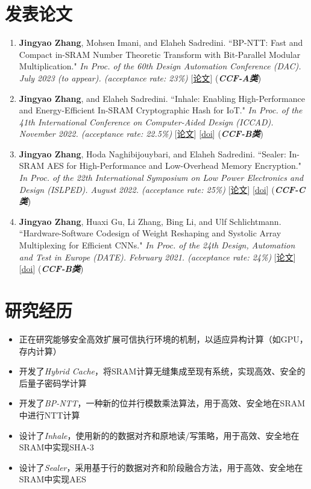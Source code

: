 \documentclass{resume}
\begin{document}
\section{发表论文}
\begin{enumerate}
  \item \textbf{Jingyao Zhang}, Mohsen Imani, and Elaheh Sadredini. ``BP-NTT: Fast and Compact in-SRAM Number Theoretic Transform with Bit-Parallel Modular Multiplication." \textit{In Proc. of the 60th Design Automation Conference (DAC). July 2023 (to appear). (acceptance rate: 23\%)} [\href{https://arxiv.org/pdf/2303.00173.pdf}{论文}] (\textbf{\textit{CCF-A类}}) 
  \item \textbf{Jingyao Zhang}, and Elaheh Sadredini. ``Inhale: Enabling High-Performance and Energy-Efficient In-SRAM Cryptographic Hash for IoT." \textit{In Proc. of the 41th International Conference on Computer-Aided Design (ICCAD). November 2022. (acceptance rate: 22.5\%)} [\href{https://arxiv.org/pdf/2208.07570.pdf}{论文}] [\href{https://dl.acm.org/doi/10.1145/3508352.3549381}{doi}] (\textbf{\textit{CCF-B类}}) 
  \item \textbf{Jingyao Zhang}, Hoda Naghibijouybari, and Elaheh Sadredini. ``Sealer: In-SRAM AES for High-Performance and Low-Overhead Memory Encryption." \textit{In Proc. of the 22th International Symposium on Low Power Electronics and Design (ISLPED). August 2022. (acceptance rate: 25\%)} [\href{https://arxiv.org/pdf/2207.01298.pdf}{论文}] [\href{https://dl.acm.org/doi/10.1145/3531437.3539699}{doi}] (\textbf{\textit{CCF-C类}}) 
  \item \textbf{Jingyao Zhang}, Huaxi Gu, Li Zhang, Bing Li, and Ulf Schlichtmann. ``Hardware-Software Codesign of Weight Reshaping and Systolic Array Multiplexing for Efficient CNNs." \textit{In Proc. of the 24th Design, Automation and Test in Europe (DATE). February 2021. (acceptance rate: 24\%)} [\href{https://drive.google.com/file/d/1vOt_0eP0xW03lu6KngMNexirfjsxyFDI/view}{论文}] [\href{https://ieeexplore.ieee.org/document/9474215}{doi}] (\textbf{\textit{CCF-B类}}) 
\end{enumerate}

\section{研究经历}
\vspace{-8pt}
\begin{itemize}
  \item 正在研究能够安全高效扩展可信执行环境的机制，以适应异构计算（如GPU，存内计算）
  \item 开发了\textit{Hybrid Cache}，将SRAM计算无缝集成至现有系统，实现高效、安全的后量子密码学计算
  \item 开发了\textit{BP-NTT}，一种新的位并行模数乘法算法，用于高效、安全地在SRAM中进行NTT计算
  \item 设计了\textit{Inhale}，使用新的的数据对齐和原地读/写策略，用于高效、安全地在SRAM中实现SHA-3
  \item 设计了\textit{Sealer}，采用基于行的数据对齐和阶段融合方法，用于高效、安全地在SRAM中实现AES
\end{itemize}
\end{document}
